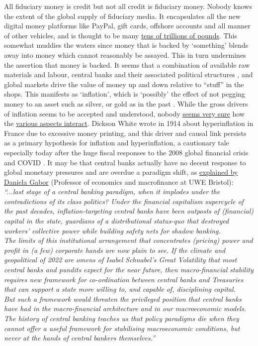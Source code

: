 All fiduciary money is credit but not all credit is fiduciary money. Nobody knows the extent of the global supply of fiduciary media. It encapsulates all the new digital money platforms like PayPal, gift cards, offshore accounts and all manner of other vehicles, and is thought to be many \href{https://www.bis.org/publ/qtrpdf/r_qt2212h.pdf}{tens of trillions of pounds}\cite{borio2017fx}. This somewhat muddies the waters since money that is backed by `something' blends away into money which cannot reasonably be assayed. This in turn undermines the assertion that money is backed. It seems that a combination of available raw materials and labour, central banks and their associated political structures \cite{barsky1987fisher}, and global markets drive the value of money up and down relative to ``stuff'' in the shops. This manifests as `inflation', which is `possibly' the effect of not pegging money to an asset such as silver, or gold as in the past \cite{hall2009inflation}. While the gross drivers of inflation seems to be accepted and understood, nobody \href{https://www.dailymail.co.uk/news/article-10966165/Jerome-Powell-admits-understand-better-little-understand-inflation.html}{seems very sure} how the \href{https://www.bloomberg.com/opinion/articles/2022-08-19/this-economy-is-proving-too-complicated-for-economists}{various aspects interact}. Dickson White wrote in 1914 about hyperinflation in France due to excessive money printing, and this driver and causal link persists as a primary hypothesis for inflation and hyperinflation, a cautionary tale especially today after the huge fiscal responses to the 2008 global financial crisis and COVID \cite{white1914fiat}. It may be that central banks actually have no decent response to global monetary pressures and are overdue a paradigm shift, as \href{https://www.ft.com/content/2d79d153-fffa-4441-b79f-0a808a51108f}{explained by Daniela Gabor} (Professor of economics and macrofinance at UWE Bristol):\\ 
\textit{``...last stage of a central banking paradigm, when it implodes under the contradictions of its class politics? Under the financial capitalism supercycle of the past decades, inflation-targeting central banks have been outposts of (financial) capital in the state, guardians of a distributional status-quo that destroyed workers’ collective power while building safety nets for shadow banking.\\
The limits of this institutional arrangement that concentrates (pricing) power and profit in (a few) corporate hands are now plain to see. If the climate and geopolitical of 2022 are omens of Isabel Schnabel’s Great Volatility that most central banks and pundits expect for the near future, then macro-financial stability requires new framework for co-ordination between central banks and Treasuries that can support a state more willing to, and capable of, disciplining capital.\\
But such a framework would threaten the privileged position that central banks have had in the macro-financial architecture and in our macroeconomic models. The history of central banking teaches us that policy paradigms die when they cannot offer a useful framework for stabilising macroeconomic conditions, but never at the hands of central bankers themselves.''}\par
